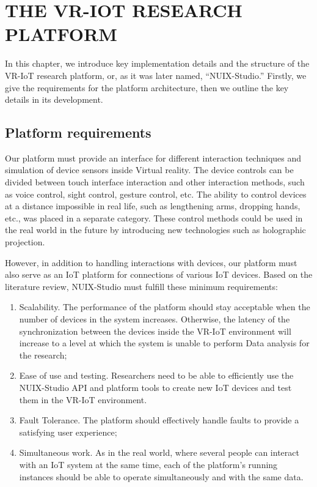 
\chapter{\MakeUppercase{The VR-IoT Research Platform}}

In this chapter, we introduce key implementation details and the structure of the VR-IoT research platform, or, as it was later named, ``NUIX-Studio.'' Firstly, we give the requirements for the platform architecture, then we outline the key details in its development.

\section{Platform requirements}

Our platform must provide an interface for different interaction techniques and simulation of device sensors inside Virtual reality. The device controls can be divided between touch interface interaction and other interaction methods, such as voice control, sight control, gesture control, etc. The ability to control devices at a distance impossible in real life, such as lengthening arms, dropping hands, etc., was placed in a separate category. These control methods could be used in the real world in the future by introducing new technologies such as holographic projection. 

However, in addition to handling interactions with devices, our platform must also serve as an IoT platform for connections of various IoT devices. Based on the literature review, NUIX-Studio must fulfill these minimum requirements:
\begin{enumerate}
\item Scalability. The performance of the platform should stay acceptable when the number of devices in the system increases. Otherwise, the latency of the synchronization between the devices inside the VR-IoT environment will increase to a level at which the system is unable to perform Data analysis for the research;
\item Ease of use and testing. Researchers need to be able to efficiently use the NUIX-Studio API and platform tools to create new IoT devices and test them in the VR-IoT environment.
\item Fault Tolerance. The platform should effectively handle faults to provide a satisfying user experience;
\item Simultaneous work. As in the real world, where several people can interact with an IoT system at the same time, each of the platform's running instances should be able to operate simultaneously and with the same data.
\end{enumerate}

